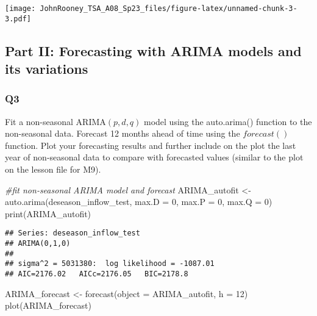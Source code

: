\documentclass[
]{article}
\newenvironment{Shaded}{\begin{snugshade}}{\end{snugshade}}
\newcommand{\AttributeTok}[1]{\textcolor[rgb]{0.77,0.63,0.00}{#1}}
\newcommand{\CommentTok}[1]{\textcolor[rgb]{0.56,0.35,0.01}{\textit{#1}}}
\newcommand{\DecValTok}[1]{\textcolor[rgb]{0.00,0.00,0.81}{#1}}
\newcommand{\FunctionTok}[1]{\textcolor[rgb]{0.00,0.00,0.00}{#1}}
\newcommand{\NormalTok}[1]{#1}
\newcommand{\OtherTok}[1]{\textcolor[rgb]{0.56,0.35,0.01}{#1}}
\begin{document}
\texttt{[image: JohnRooney\_TSA\_A08\_Sp23\_files/figure-latex/unnamed-chunk-3-3.pdf]}

\hypertarget{part-ii-forecasting-with-arima-models-and-its-variations}{%
\subsection{Part II: Forecasting with ARIMA models and its
variations}\label{part-ii-forecasting-with-arima-models-and-its-variations}}

\hypertarget{q3}{%
\subsubsection{Q3}\label{q3}}

Fit a non-seasonal ARIMA\((p,d,q)\) model using the auto.arima()
function to the non-seasonal data. Forecast 12 months ahead of time
using the \(forecast()\) function. Plot your forecasting results and
further include on the plot the last year of non-seasonal data to
compare with forecasted values (similar to the plot on the lesson file
for M9).

\begin{Shaded}
\begin{Highlighting}[]
\CommentTok{\#fit non{-}seasonal ARIMA model and forecast}
\NormalTok{ARIMA\_autofit }\OtherTok{\textless{}{-}} \FunctionTok{auto.arima}\NormalTok{(deseason\_inflow\_test, }\AttributeTok{max.D =} \DecValTok{0}\NormalTok{, }\AttributeTok{max.P =} \DecValTok{0}\NormalTok{, }\AttributeTok{max.Q =} \DecValTok{0}\NormalTok{)}
\FunctionTok{print}\NormalTok{(ARIMA\_autofit)}
\end{Highlighting}
\end{Shaded}

\begin{verbatim}
## Series: deseason_inflow_test 
## ARIMA(0,1,0) 
## 
## sigma^2 = 5031380:  log likelihood = -1087.01
## AIC=2176.02   AICc=2176.05   BIC=2178.8
\end{verbatim}

\begin{Shaded}
\begin{Highlighting}[]
\NormalTok{ARIMA\_forecast }\OtherTok{\textless{}{-}} \FunctionTok{forecast}\NormalTok{(}\AttributeTok{object =}\NormalTok{ ARIMA\_autofit, }\AttributeTok{h =} \DecValTok{12}\NormalTok{)}
\FunctionTok{plot}\NormalTok{(ARIMA\_forecast)}
\end{Highlighting}
\end{Shaded}
\end{document}
